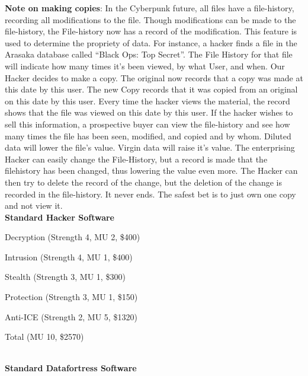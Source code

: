 \documentclass[11pt,twoside,a4paper]{article}
\newenvironment{local_itemize}{
\begin{itemize}
     \setlength{\itemsep}{1pt}
     \setlength{\parskip}{0pt}
     \setlength{\parsep}{0pt}}
{\end{itemize}
}
\begin{document}
\begin{multicols}{2}
\textbf{Note on making copies}: In the Cyberpunk future, all files have a file-history, recording all modifications to the file. Though modifications can be made to the file-history, the File-history now has a record of the modification. This feature is used to determine the propriety of data. For instance, a hacker finds a file in the Arasaka database called ``Black Ops: Top Secret''. The File History for that file will indicate how many times it's been viewed, by what User, and when. Our Hacker decides to make a copy. The original now records that a copy was made at this date by this user. The new Copy records that it was copied from an original on this date by this user. Every time the hacker views the material, the record shows that the file was viewed on this date by this user. If the hacker wishes to sell this information, a prospective buyer can view the file-history and see how many times the file has been seen, modified, and copied and by whom. Diluted data will lower the file's value. Virgin data will raise it's value. The enterprising Hacker can easily change the File-History, but a record is made that the filehistory has been changed, thus lowering the value even more. The Hacker can then try to delete the record of the change, but the deletion of the change is recorded in the file-history. It never ends. The safest bet is to just own one copy and not view it. ~\\

\textbf{\large Standard Hacker Software} %
\begin{local_itemize}
	\item[] Decryption (Strength 4, MU 2, \$400)
	\item[] Intrusion (Strength 4, MU 1, \$400)
	\item[] Stealth (Strength 3, MU 1, \$300)
	\item[] Protection (Strength 3, MU 1, \$150)
	\item[] Anti-ICE (Strength 2, MU 5, \$1320)
	\item[] Total (MU 10, \$2570)
\end{local_itemize}~\\

\textbf{\large Standard Datafortress Software} %


\end{multicols}
\end{document}
